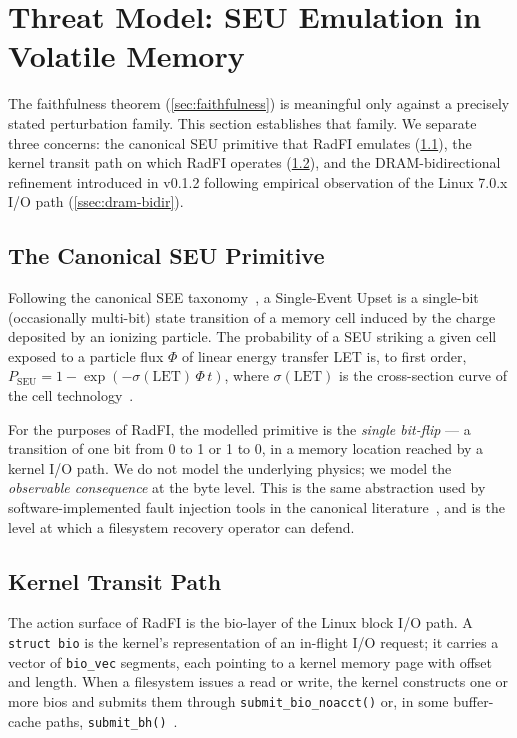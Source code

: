 \section{Threat Model: SEU Emulation in Volatile Memory}\label{sec:threat}

The faithfulness theorem (\cref{sec:faithfulness}) is meaningful only
against a precisely stated perturbation family. This section
establishes that family. We separate three concerns: the canonical
SEU primitive that RadFI emulates (\cref{ssec:seu-primitive}), the
kernel transit path on which RadFI operates
(\cref{ssec:kernel-transit}), and the DRAM-bidirectional refinement
introduced in v0.1.2 following empirical observation of the Linux
7.0.x I/O path (\cref{ssec:dram-bidir}).

\subsection{The Canonical SEU Primitive}\label{ssec:seu-primitive}

Following the canonical SEE
taxonomy~\cite{dodd2003seu,baumann2005softerrors}, a Single-Event
Upset is a single-bit (occasionally multi-bit) state transition of a
memory cell induced by the charge deposited by an ionizing particle.
The probability of a SEU striking a given cell exposed to a particle
flux \(\Phi\) of linear energy transfer LET is, to first order,
\(P_{\text{SEU}} = 1 - \exp(-\sigma(\text{LET}) \, \Phi \, t)\),
where \(\sigma(\text{LET})\) is the cross-section curve of the cell
technology~\cite{petersen1996crosssection}.

For the purposes of RadFI, the modelled primitive is the
\emph{single bit-flip} --- a transition of one bit from 0 to 1 or 1
to 0, in a memory location reached by a kernel I/O path. We do not
model the underlying physics; we model the \emph{observable
consequence} at the byte level. This is the same abstraction used by
software-implemented fault injection tools in the canonical
literature~\cite{carreira1998xception,hsueh1997faultinjection}, and
is the level at which a filesystem recovery operator can defend.

\subsection{Kernel Transit Path}\label{ssec:kernel-transit}

The action surface of RadFI is the bio-layer of the Linux block I/O
path. A \texttt{struct bio} is the kernel's representation of an
in-flight I/O request; it carries a vector of \texttt{bio\_vec}
segments, each pointing to a kernel memory page with offset and
length. When a filesystem issues a read or write, the kernel
constructs one or more bios and submits them through
\texttt{submit\_bio\_noacct()} or, in some buffer-cache paths,
\texttt{submit\_bh()}~\cite{corbet2005ldd3}.

